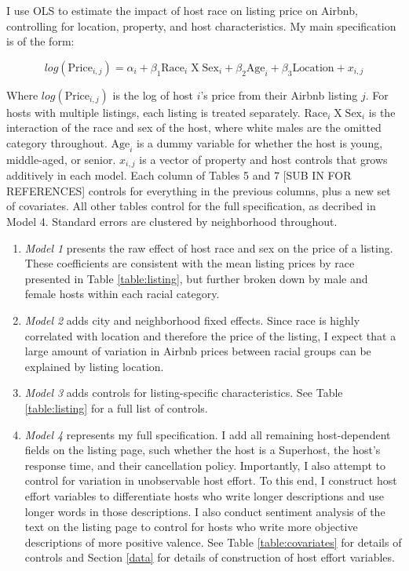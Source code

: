 \label{empirical}

I use OLS to estimate the impact of host race on listing price on Airbnb, controlling for location, property, and host characteristics. My main specification is of the form:

\[ log(\text{Price}_{i,j}) = \alpha_i + \beta_1 \text{Race}_{i} \;  \text{X} \; \text{Sex}_i + \beta_2 \text{Age}_i + \beta_3 \text{Location} +  x_{i,j} \]

Where $log(\text{Price}_{i,j})$ is the log of host $i$'s price from their Airbnb listing $j$. For hosts with multiple listings, each listing is treated separately. $\text{Race}_{i} \;  \text{X} \; \text{Sex}_i$ is the interaction of the race and sex of the host, where white males are the omitted category throughout. $\text{Age}_i$ is a dummy variable for whether the host is young, middle-aged, or senior. $x_{i,j}$ is a vector of property and host controls that grows additively in each model. Each column of Tables 5 and 7 [SUB IN FOR REFERENCES] controls for everything in the previous columns, plus a new set of covariates. All other tables control for the full specification, as decribed in Model 4. Standard errors are clustered by neighborhood throughout.

\begin{enumerate}
	\item \textit{Model 1} presents the raw effect of host race and sex on the price of a listing. These coefficients are consistent with the mean listing prices by race presented in Table \ref{table:listing}, but further broken down by male and female hosts within each racial category.
	
	\item \textit{Model 2} adds city and neighborhood fixed effects. Since race is highly correlated with location and therefore the price of the listing, I expect that a large amount of variation in Airbnb prices between racial groups can be explained by listing location. 
	
	\item \textit{Model 3} adds controls for listing-specific characteristics. See Table \ref{table:listing} for a full list of controls. 
	
	\item \textit{Model 4} represents my full specification. I add all remaining host-dependent fields on the listing page, such whether the host is a Superhost, the host's response time, and their cancellation policy. Importantly, I also attempt to control for variation in unobservable host effort. To this end, I construct host effort variables to differentiate hosts who write longer descriptions and use longer words in those descriptions. I also conduct sentiment analysis of the text on the listing page to control for hosts who write more objective descriptions of more positive valence. See Table \ref{table:covariates} for details of controls and Section \ref{data} for details of construction of host effort variables. 
\end{enumerate}




